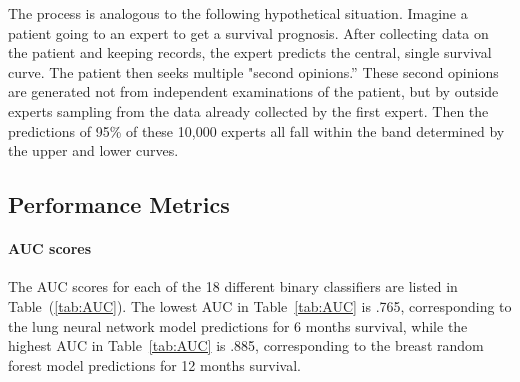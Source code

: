 \documentclass[10pt,letterpaper]{article}
\begin{document}
The process is analogous to the following hypothetical situation. Imagine a patient going to an expert to get a survival prognosis.
After collecting data on the patient and keeping records, the expert predicts the central, single survival curve. The patient then seeks multiple "second opinions.'' These second opinions are generated not from independent examinations of the patient, but by outside experts sampling from the data already collected by the first expert.
Then the predictions of 95\% of these 10,000 experts all fall within the band determined by the upper and lower curves.





\subsection*{Performance Metrics}
\label{sec:performancemetrics}


\paragraph{AUC scores}
The AUC scores for each of the 18 different binary classifiers are listed in Table~(\ref{tab:AUC}). 
The lowest AUC in Table~\ref{tab:AUC} is .765, corresponding to the lung neural network model predictions for 6 months survival, while the highest AUC in Table~\ref{tab:AUC} is .885, corresponding to the breast random forest model predictions for 12 months survival.
\end{document}
